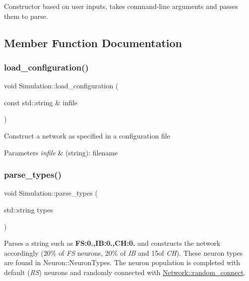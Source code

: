 Constructor based on user inputs, takes command-\/line arguments and passes them to parse. 

\subsection{Member Function Documentation}
\mbox{\label{classSimulation_acd6ce915b07465d9aaaa5fdcbb5ae077}} 
\subsubsection{\texorpdfstring{load\+\_\+configuration()}{load\_configuration()}}
{\footnotesize\ttfamily void Simulation\+::load\+\_\+configuration (\begin{DoxyParamCaption}\item[{const std\+::string \&}]{infile }\end{DoxyParamCaption})}

Construct a network as specified in a configuration file 
\begin{DoxyParams}{Parameters}
{\em infile} & (string)\+: filename \\
\hline
\end{DoxyParams}
\mbox{\label{classSimulation_afc095e76c2bcee6d31a4614022d609c3}} 
\subsubsection{\texorpdfstring{parse\+\_\+types()}{parse\_types()}}
{\footnotesize\ttfamily void Simulation\+::parse\+\_\+types (\begin{DoxyParamCaption}\item[{std\+::string}]{types }\end{DoxyParamCaption})}

Parses a string such as {\bfseries FS\+:0.,IB\+:0.,CH\+:0.} and constructs the network accordingly (20\% of {\itshape FS} neurons, 20\% of {\itshape IB} and 15of {\itshape CH}). These neuron types are found in Neuron\+::\+Neuron\+Types. The neuron population is completed with default ({\itshape RS}) neurons and randomly connected with \hyperlink{classNetwork_a4c751a78c7bc5e27c6b36df78c9c70c0}{Network\+::random\+\_\+connect}. \mbox{\label{classSimulation_ae5c367f87c0b5dc9740bc6d00e44e72c}} 
